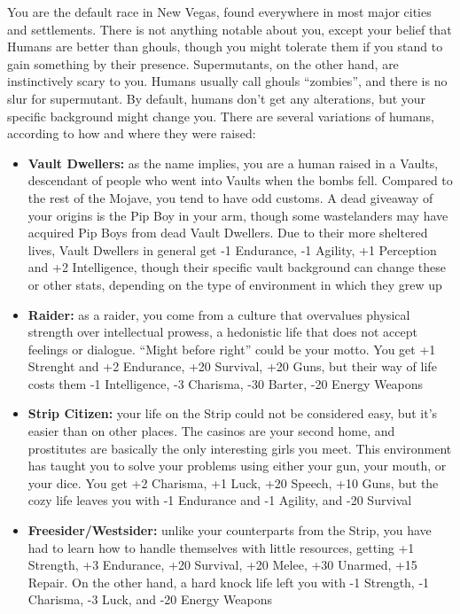 \documentclass[11pt]{article} %
\begin{document}
You are the default race in New Vegas, found everywhere in most major cities and settlements. There is not anything notable about you, except your belief that Humans are better than ghouls, though you might tolerate them if you stand to gain something by their presence. Supermutants, on the other hand, are instinctively scary to you. Humans usually call ghouls ``zombies'', and there is no slur for supermutant. By default, humans don't get any alterations, but your specific background might change you. There are several variations of humans, according to how and where they were raised:
\begin{itemize}
\item \textbf{Vault Dwellers:} as the name implies, you are a human raised in a Vaults, descendant of people who went into Vaults when the bombs fell. Compared to the rest of the Mojave, you tend to have odd customs. A dead giveaway of your origins is the Pip Boy in your arm, though some wastelanders may have acquired Pip Boys from dead Vault Dwellers. Due to their more sheltered lives, Vault Dwellers in general get -1 Endurance, -1 Agility, +1 Perception and +2 Intelligence, though their specific vault background can change these or other stats, depending on the type of environment in which they grew up 
\item \textbf{Raider:} as a raider, you come from a culture that overvalues physical strength over intellectual prowess, a hedonistic life that does not accept feelings or dialogue. ``Might before right'' could be your motto. You get +1 Strenght and +2 Endurance, +20 Survival, +20 Guns, but their way of life costs them -1 Intelligence, -3 Charisma, -30 Barter, -20 Energy Weapons
\item \textbf{Strip Citizen:} your life on the Strip could not be considered easy, but it's easier than on other places. The casinos are your second home, and prostitutes are basically the only interesting girls you meet. This environment has taught you to solve your problems using either your gun, your mouth, or your dice. You get +2 Charisma, +1 Luck, +20 Speech, +10 Guns, but the cozy life leaves you with -1 Endurance and -1 Agility, and -20 Survival
\item \textbf{Freesider/Westsider:} unlike your counterparts from the Strip, you have had to learn how to handle themselves with little resources, getting +1 Strength, +3 Endurance, +20 Survival, +20 Melee, +30 Unarmed, +15 Repair. On the other hand, a hard knock life left you with -1 Strength, -1 Charisma, -3 Luck, and -20 Energy Weapons

\end{itemize}
\end{document}
